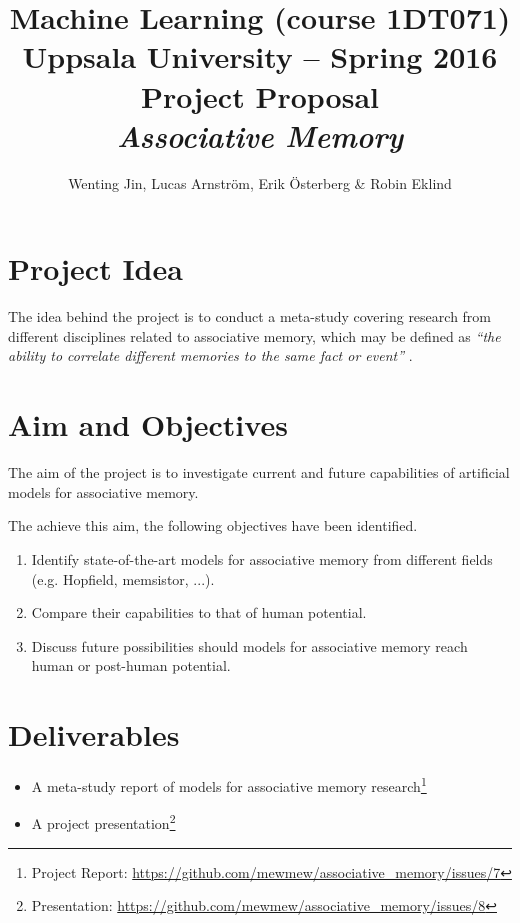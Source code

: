 \documentclass[12pt, a4paper]{article}
\title{\textbf{Machine Learning (course 1DT071) \\
    Uppsala University -- Spring 2016 \\
    Project Proposal \\
    \textit{Associative Memory}
  }
}
\author{Wenting Jin, Lucas Arnström, Erik Österberg \& Robin Eklind}
\begin{document}
\maketitle



\section{Project Idea} %



The idea behind the project is to conduct a meta-study covering research from different disciplines related to associative memory, which may be defined as \textit{``the ability to correlate different memories to the same fact or event''} \cite{memsistor}.

\section{Aim and Objectives}

The aim of the project is to investigate current and future capabilities of artificial models for associative memory.

The achieve this aim, the following objectives have been identified.

\begin{enumerate}
	\item Identify state-of-the-art models for associative memory from different fields (e.g. Hopfield, memsistor, ...).
	\item Compare their capabilities to that of human potential.
	\item Discuss future possibilities should models for associative memory reach human or post-human potential.
\end{enumerate}

\section{Deliverables}

\begin{itemize}
	\item A meta-study report of models for associative memory research\footnote{Project Report: \url{https://github.com/mewmew/associative_memory/issues/7}}
	\item A project presentation\footnote{Presentation: \url{https://github.com/mewmew/associative_memory/issues/8}}
\end{itemize}
\end{document}
